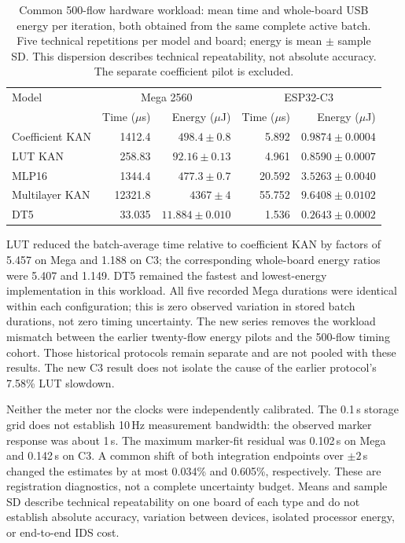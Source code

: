 \begin{table}[t]
\centering\small
\caption{Common 500-flow hardware workload: mean time and whole-board USB energy per iteration, both obtained from the same complete active batch. Five technical repetitions per model and board; energy is mean $\pm$ sample SD. This dispersion describes technical repeatability, not absolute accuracy. The separate coefficient pilot is excluded.}
\label{tab:hw500-energy}
\begin{tabular}{lrrrr}
\toprule
Model & \multicolumn{2}{c}{Mega 2560} & \multicolumn{2}{c}{ESP32-C3} \\
 & Time ($\mu$s) & Energy ($\mu$J) & Time ($\mu$s) & Energy ($\mu$J) \\
\midrule
Coefficient KAN & 1412.4 & $498.4\pm0.8$ & 5.892 & $0.9874\pm0.0004$ \\
LUT KAN & 258.83 & $92.16\pm0.13$ & 4.961 & $0.8590\pm0.0007$ \\
MLP16 & 1344.4 & $477.3\pm0.7$ & 20.592 & $3.5263\pm0.0040$ \\
Multilayer KAN & 12321.8 & $4367\pm4$ & 55.752 & $9.6408\pm0.0102$ \\
DT5 & 33.035 & $11.884\pm0.010$ & 1.536 & $0.2643\pm0.0002$ \\
\bottomrule
\end{tabular}
\end{table}

LUT reduced the batch-average time relative to coefficient KAN by factors of 5.457 on Mega and 1.188 on C3; the corresponding whole-board energy ratios were 5.407 and 1.149. DT5 remained the fastest and lowest-energy implementation in this workload. All five recorded Mega durations were identical within each configuration; this is zero observed variation in stored batch durations, not zero timing uncertainty. The new series removes the workload mismatch between the earlier twenty-flow energy pilots and the 500-flow timing cohort. Those historical protocols remain separate and are not pooled with these results. The new C3 result does not isolate the cause of the earlier protocol's 7.58\% LUT slowdown.

Neither the meter nor the clocks were independently calibrated. The 0.1\,s storage grid does not establish 10\,Hz measurement bandwidth: the observed marker response was about 1\,s. The maximum marker-fit residual was 0.102\,s on Mega and 0.142\,s on C3. A common shift of both integration endpoints over $\pm2$\,s changed the estimates by at most 0.034\% and 0.605\%, respectively. These are registration diagnostics, not a complete uncertainty budget. Means and sample SD describe technical repeatability on one board of each type and do not establish absolute accuracy, variation between devices, isolated processor energy, or end-to-end IDS cost.
